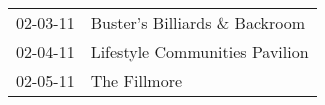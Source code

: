 \begin{supertabular}{p{0.25\columnwidth}p{0.75\columnwidth}}
 02-03-11 &   Buster's Billiards \& Backroom \\
 02-04-11 &  Lifestyle Communities Pavilion \\
 02-05-11 &                    The Fillmore \\
\end{supertabular}
